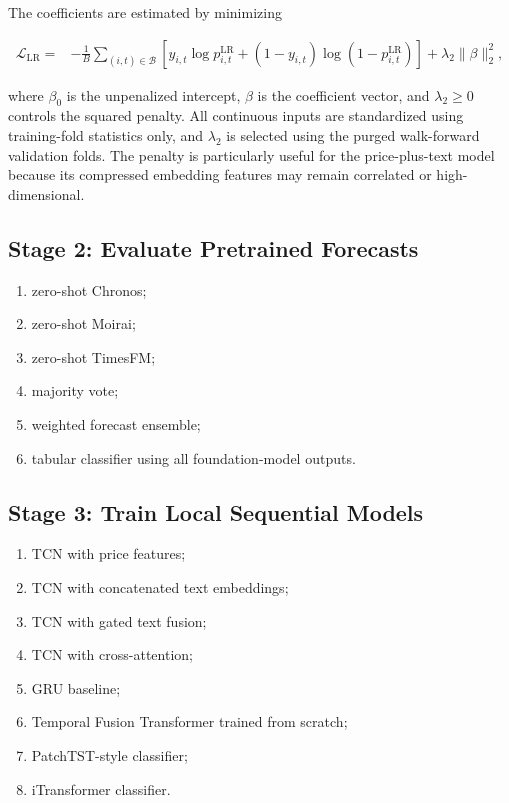 \documentclass[11pt]{article}
\begin{document}
The coefficients are estimated by minimizing

\begin{equation}
\begin{aligned}
\mathcal L_{\mathrm{LR}}
={}&
-\frac{1}{B}
\sum_{(i,t)\in\mathcal B}
\left[
y_{i,t}\log p^{\mathrm{LR}}_{i,t}
+(1-y_{i,t})\log\left(1-p^{\mathrm{LR}}_{i,t}\right)
\right]
+\lambda_2\lVert\beta\rVert_2^2,
\end{aligned}
\end{equation}

where $\beta_0$ is the unpenalized intercept, $\beta$ is the coefficient
vector, and $\lambda_2\geq0$ controls the squared penalty.  All continuous
inputs are standardized using training-fold statistics only, and
$\lambda_2$ is selected using the purged walk-forward validation folds.  The
penalty is particularly useful for the price-plus-text model because its
compressed embedding features may remain correlated or high-dimensional.

\subsection{Stage 2: Evaluate Pretrained Forecasts}

\begin{enumerate}
    \item zero-shot Chronos;
    \item zero-shot Moirai;
    \item zero-shot TimesFM;
    \item majority vote;
    \item weighted forecast ensemble;
    \item tabular classifier using all foundation-model outputs.
\end{enumerate}

\subsection{Stage 3: Train Local Sequential Models}

\begin{enumerate}
    \item TCN with price features;
    \item TCN with concatenated text embeddings;
    \item TCN with gated text fusion;
    \item TCN with cross-attention;
    \item GRU baseline;
    \item Temporal Fusion Transformer trained from scratch;
    \item PatchTST-style classifier;
    \item iTransformer classifier.
\end{enumerate}
\end{document}
